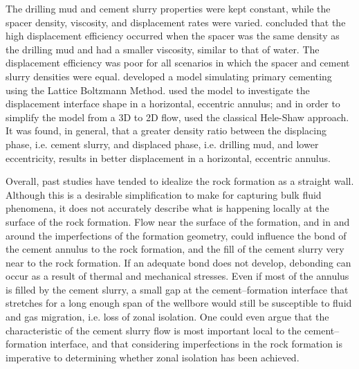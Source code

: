\documentclass[pdftex,ms]{pittetd}
\begin{document}
The drilling mud and cement slurry properties were kept constant, while the spacer density, viscosity, and displacement rates were varied.
\citeauthor{Zul12} concluded that the high displacement efficiency occurred when the spacer was the same density as the drilling mud and had a smaller viscosity, similar to that of water.
The displacement efficiency was poor for all scenarios in which the spacer and cement slurry densities were equal.
\citet{zhao2016lattice} developed a model simulating primary cementing using the Lattice Boltzmann Method.
\citeauthor{zhao2016lattice} used the model to investigate the displacement interface shape in a horizontal, eccentric annulus; and in order to simplify the model from a 3D to 2D flow, used the classical Hele-Shaw approach.
It was found, in general, that a greater density ratio between the displacing phase, i.e. cement slurry, and displaced phase, i.e. drilling mud, and lower eccentricity, results in better displacement in a horizontal, eccentric annulus.


Overall, past studies have tended to idealize the rock formation as a straight wall.
Although this is a desirable simplification to make for capturing bulk fluid phenomena, it does not accurately describe what is happening locally at the surface of the rock formation.
Flow near the surface of the formation, and in and around the imperfections of the formation geometry, could influence the bond of the cement annulus to the rock formation, and the fill of the cement slurry very near to the rock formation.
If an adequate bond does not develop, debonding can occur as a result of thermal and mechanical stresses.
Even if most of the annulus is filled by the cement slurry, a small gap at the cement--formation interface that stretches for a long enough span of the wellbore would still be susceptible to fluid and gas migration, i.e. loss of zonal isolation.
One could even argue that the characteristic of the cement slurry flow is most important local to the cement--formation interface, and that considering imperfections in the rock formation is imperative to determining whether zonal isolation has been achieved.
\end{document}

